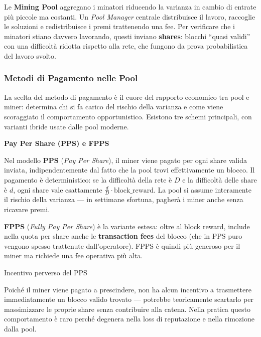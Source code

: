 \documentclass[
  italian,
  openany]{book}
\begin{document}
Le \textbf{Mining Pool} aggregano i minatori riducendo la varianza in
cambio di entrate più piccole ma costanti. Un \emph{Pool Manager}
centrale distribuisce il lavoro, raccoglie le soluzioni e redistribuisce
i premi trattenendo una fee. Per verificare che i minatori stiano
davvero lavorando, questi inviano \textbf{shares}: blocchi ``quasi
validi'' con una difficoltà ridotta rispetto alla rete, che fungono da
prova probabilistica del lavoro svolto.

\subsubsection{Metodi di Pagamento nelle
Pool}\label{metodi-di-pagamento-nelle-pool}

La scelta del metodo di pagamento è il cuore del rapporto economico tra
pool e miner: determina chi si fa carico del rischio della varianza e
come viene scoraggiato il comportamento opportunistico. Esistono tre
schemi principali, con varianti ibride usate dalle pool moderne.

\textbf{Pay Per Share (PPS) e FPPS}

Nel modello \textbf{PPS} (\emph{Pay Per Share}), il miner viene pagato
per ogni share valida inviata, indipendentemente dal fatto che la pool
trovi effettivamente un blocco. Il pagamento è deterministico: se la
difficoltà della rete è \(D\) e la difficoltà delle share è \(d\), ogni
share vale esattamente \(\frac{d}{D} \cdot \text{block\_reward}\). La
pool si assume interamente il rischio della varianza --- in settimane
sfortuna, pagherà i miner anche senza ricavare premi.

\textbf{FPPS} (\emph{Fully Pay Per Share}) è la variante estesa: oltre
al block reward, include nella quota per share anche le
\textbf{transaction fees} del blocco (che in PPS puro vengono spesso
trattenute dall'operatore). FPPS è quindi più generoso per il miner ma
richiede una fee operativa più alta.

\begin{calloutwarning}{Incentivo perverso del PPS}

Poiché il miner viene pagato a prescindere, non ha alcun incentivo a
trasmettere immediatamente un blocco valido trovato --- potrebbe
teoricamente scartarlo per massimizzare le proprie share senza
contribuire alla catena. Nella pratica questo comportamento è raro
perché degenera nella loss di reputazione e nella rimozione dalla pool.

\end{calloutwarning}
\end{document}
